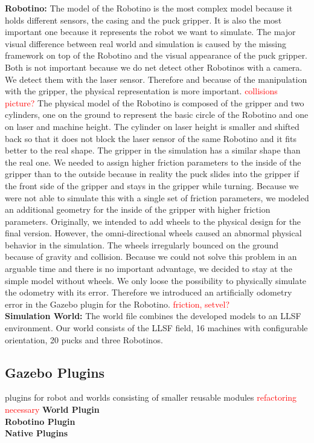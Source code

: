 \textbf{Robotino:} The model of the Robotino is the most complex model because it holds different sensors, the casing and the puck gripper. It is also the most important one because it represents the robot we want to simulate. The major visual difference between real world and simulation is caused by the missing framework on top of the Robotino and the visual appearance of the puck gripper. Both is not important because we do net detect other Robotinos with a camera. We detect them with the laser sensor. Therefore and because of the manipulation with the gripper, the physical representation is more important. \textcolor{red}{collisions picture?} The physical model of the Robotino is composed of the gripper and two cylinders, one on the ground to represent the basic circle of the Robotino and one on laser and machine height. The cylinder on laser height is smaller and shifted back so that it does not block the laser sensor of the same Robotino and it fits better to the real shape. The gripper in the simulation has a similar shape than the real one. We needed to assign higher friction parameters to the inside of the gripper than to the outside because in reality the puck slides into the gripper if the front side of the gripper and stays in the gripper while turning. Because we were not able to simulate this with a single set of friction parameters, we modeled an additional geometry for the inside of the gripper with higher friction parameters. Originally, we intended to add wheels to the physical design for the final version. However, the omni-directional wheels caused an abnormal physical behavior in the simulation. The wheels irregularly bounced on the ground because of gravity and collision. Because we could not solve this problem in an arguable time and there is no important advantage, we decided to stay at the simple model without wheels. We only loose the possibility to physically simulate the odometry with its error. Therefore we introduced an artificially odometry error in the Gazebo plugin for the Robotino. \textcolor{red}{friction, setvel?}\\
\textbf{Simulation World:} The world file combines the developed models to an LLSF environment. Our world consists of the LLSF field, 16 machines with configurable orientation, 20 pucks and three Robotinos.\\


\subsection{Gazebo Plugins}
plugins for robot and worlds consisting of smaller reusable modules \textcolor{red}{refactoring necessary}
\textbf{World Plugin}
\\
\textbf{Robotino Plugin}
\\
\textbf{Native Plugins}


